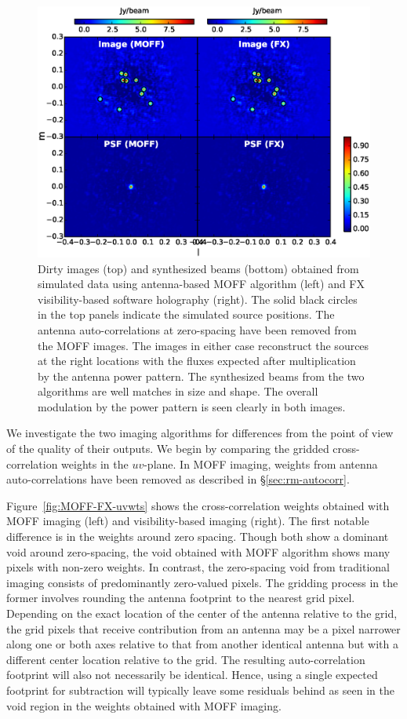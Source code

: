 \documentclass[a4paper,fleqn,usenatbib]{../mnras}
\begin{document}
\begin{figure}
  \includegraphics[width=\columnwidth]{MOFF_FX_image_comparison.eps}
  \caption{Dirty images (top) and synthesized beams (bottom) obtained from 
    simulated data using antenna-based MOFF algorithm (left) and FX 
    visibility-based software holography (right). The solid black circles in the
    top panels indicate the simulated source positions. The antenna 
    auto-correlations at zero-spacing have been removed from the MOFF images. 
    The images in either case reconstruct the sources at the right locations 
    with the fluxes expected after multiplication by the antenna power pattern. 
    The synthesized beams from the two algorithms are well matches in size and
    shape. The overall modulation by the power pattern is seen clearly in both
    images.}
  \label{fig:MOFF-FX-image}
\end{figure}

We investigate the two imaging algorithms for differences from the point of 
view of the quality of their outputs. We begin by comparing the gridded 
cross-correlation weights in the $uv$-plane. In MOFF imaging, weights 
from antenna auto-correlations have been removed as described in 
\S\ref{sec:rm-autocorr}. 

Figure~\ref{fig:MOFF-FX-uvwts} shows the cross-correlation weights obtained 
with MOFF imaging (left) and visibility-based imaging (right). The first 
notable difference is in the weights around zero spacing. Though both show a
dominant void around zero-spacing, the void obtained with MOFF algorithm shows 
many pixels with non-zero weights. In contrast, the zero-spacing void from 
traditional imaging consists of predominantly zero-valued pixels. The gridding
process in the former involves rounding the antenna footprint to the nearest 
grid pixel. Depending on the exact location of the center of the antenna 
relative to the grid, the grid pixels that receive contribution from an
antenna may be a pixel narrower along one or both axes relative to that from
another identical antenna but with a different center location relative to the
grid. The resulting auto-correlation footprint will also not necessarily be 
identical. Hence, using a single expected footprint for subtraction will
typically leave some residuals behind as seen in the void region in the 
weights obtained with MOFF imaging. 
\end{document}
